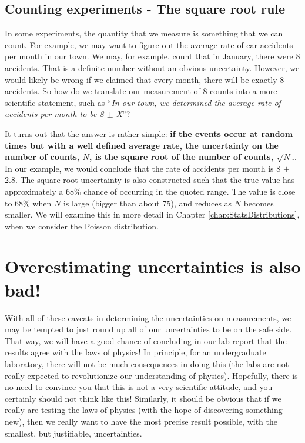 \subsection{Counting experiments - The square root rule}
\label{sec:countingError}
In some experiments, the quantity that we measure is something that we can count. For example, we may want to figure out the average rate of car accidents per month in our town. We may, for example, count that in January, there were 8 accidents. That is a definite number without an obvious uncertainty. However, we would likely be wrong if we claimed that every month, there will be exactly 8 accidents. So how do we translate our measurement of 8 counts into a more scientific statement, such as ``\textit{In our town, we determined the average rate of accidents per month to be 8 $\pm$ X}''? 

It turns out that the answer is rather simple: \textbf{if the events occur at random times but with a well defined average rate, the uncertainty on the number of counts, $N$, is the square root of the number of counts, $\sqrt{N}$.}. In our example, we would conclude that the rate of accidents per month is 8 $\pm$ 2.8. The square root uncertainty is also constructed such that the true value has approximately a 68\% chance of occurring in the quoted range. The value is close to 68\% when $N$ is large (bigger than about 75), and reduces as $N$ becomes smaller. We will examine this in more detail in Chapter \ref{chap:StatsDistributions}, when we consider the Poisson distribution.

\section{Overestimating uncertainties is also bad!}
With all of these caveats in determining the uncertainties on measurements, we may be tempted to just round up all of our uncertainties to be on the safe side. That way, we will have a good chance of concluding in our lab report that the results agree with the laws of physics! In principle, for an undergraduate laboratory, there will not be much consequences in doing this (the labs are not really expected to revolutionize our understanding of physics). Hopefully, there is no need to convince you that this is not a very scientific attitude, and you certainly should not think like this! Similarly, it should be obvious that if we really are testing the laws of physics (with the hope of discovering something new), then we really want to have the most precise result possible, with the smallest, but justifiable, uncertainties.


